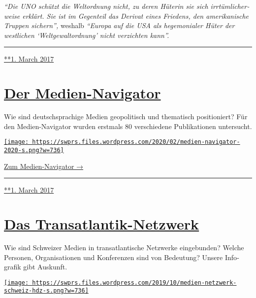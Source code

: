 \emph{``Die UNO schützt die Welt­ordnung nicht, zu deren Hüterin sie
sich irr­tüm­licher­weise erklärt. Sie ist im Gegen­teil das Derivat
eines Friedens, den ameri­ka­nische Truppen sichern'',} weshalb
\emph{``Europa auf die USA als hege­mon­ialer Hüter der west­lichen
`Welt­gewalt­ordnung' nicht ver­zichten kann''.}

\begin{center}\rule{0.5\linewidth}{\linethickness}\end{center}

\href{https://swprs.org/2017/03/01/eine-bruecke-ueber-den-atlantik/}{**1.
March 2017}

\hypertarget{der-medien-navigator}{%
\section{\texorpdfstring{\href{https://swprs.org/2017/03/01/der-medien-navigator/}{Der
Medien-Navigator}}{Der Medien-Navigator}}\label{der-medien-navigator}}

Wie sind deutsch­spra­chige Medien geo­po­li­tisch und the­matisch
posi­tio­niert? Für den Medien-Navi­gator wurden erst­mals 80
verschiedene Publi­ka­tionen unter­sucht.

\href{https://swprs.org/medien-navigator/}{\texttt{[image: https://swprs.files.wordpress.com/2020/02/medien-navigator-2020-s.png?w=736]}}

\href{https://swprs.org/medien-navigator/}{Zum Medien-Navigator →}

\begin{center}\rule{0.5\linewidth}{\linethickness}\end{center}

\href{https://swprs.org/2017/03/01/der-medien-navigator/}{**1. March
2017}

\hypertarget{das-transatlantik-netzwerk}{%
\section{\texorpdfstring{\href{https://swprs.org/2017/03/01/das-netzwerk/}{Das
Transatlantik-Netzwerk}}{Das Transatlantik-Netzwerk}}\label{das-transatlantik-netzwerk}}

Wie sind Schweizer Medien in trans­at­lantische Netz­werke
ein­ge­bunden? Welche Personen, Organi­sa­tionen und Kon­fe­ren­zen sind
von Bedeutung? Unsere Info­grafik gibt Auskunft.

\href{https://swprs.org/netzwerk-medien-schweiz}{\texttt{[image: https://swprs.files.wordpress.com/2019/10/medien-netzwerk-schweiz-hdz-s.png?w=736]}}

